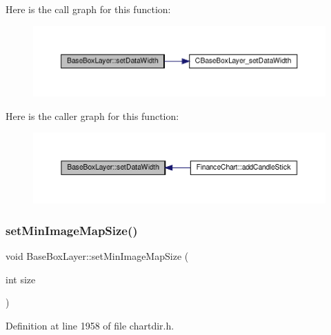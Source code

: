 Here is the call graph for this function\+:
\nopagebreak
\begin{figure}[H]
\begin{center}
\leavevmode
\includegraphics[width=350pt]{class_base_box_layer_a49c2e59633573b52f02e399bec37b46e_cgraph}
\end{center}
\end{figure}
Here is the caller graph for this function\+:
\nopagebreak
\begin{figure}[H]
\begin{center}
\leavevmode
\includegraphics[width=350pt]{class_base_box_layer_a49c2e59633573b52f02e399bec37b46e_icgraph}
\end{center}
\end{figure}
\mbox{\label{class_base_box_layer_af812d2d5a07c3e21c928aca3245b2ad9}} 
\subsubsection{\texorpdfstring{set\+Min\+Image\+Map\+Size()}{setMinImageMapSize()}}
{\footnotesize\ttfamily void Base\+Box\+Layer\+::set\+Min\+Image\+Map\+Size (\begin{DoxyParamCaption}\item[{int}]{size }\end{DoxyParamCaption})\hspace{0.3cm}{\ttfamily [inline]}}



Definition at line 1958 of file chartdir.\+h.

